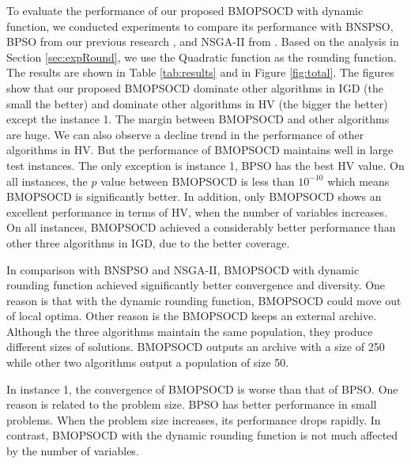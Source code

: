\documentclass[10pt,journal,compsoc]{IEEEtran}
\begin{document}
To evaluate the performance of our proposed BMOPSOCD with dynamic function, we conducted experiments to compare its performance with
BNSPSO, BPSO from our previous research \cite{Tan2016a}, and NSGA-II from \cite{Tan2016}. Based on the analysis in Section \ref{sec:expRound}, we use the Quadratic function as the rounding function. The results are shown in Table \ref{tab:results} and in Figure \ref{fig:total}. The figures show that our proposed BMOPSOCD dominate other algorithms in IGD (the small the better) and dominate other algorithms in HV (the bigger the better) except the instance 1. The margin between BMOPSOCD and other algorithms are huge. We can also observe a decline trend in the performance of other algorithms in HV. But the performance of BMOPSOCD maintains well in large test instances.
The only exception is instance 1, BPSO has the best HV value. On all instances, the $p$ value between BMOPSOCD is less than $10^{-10}$ which means BMOPSOCD is significantly better. In addition, only BMOPSOCD shows an excellent performance in terms of HV, when the number of variables increases. On all instances, BMOPSOCD achieved a considerably better performance than other three algorithms in IGD, due to the better coverage.

In comparison with BNSPSO and NSGA-II, BMOPSOCD with dynamic rounding function achieved significantly better convergence and diversity. One reason is that with the dynamic
rounding function, BMOPSOCD could move out of local optima. 
Other reason is the BMOPSOCD
keeps an external archive. Although the three algorithms maintain the same population, they produce different sizes of solutions. BMOPSOCD outputs an archive with a size of 250 while other two algorithms output a population of size 50.

In instance 1, the convergence of BMOPSOCD is worse than that of BPSO. 
One reason is related to the problem size. BPSO has better performance in small problems. When the problem size increases, its performance drops rapidly. In contrast, BMOPSOCD with the dynamic rounding function is not much affected by the number of variables.

\end{document}
